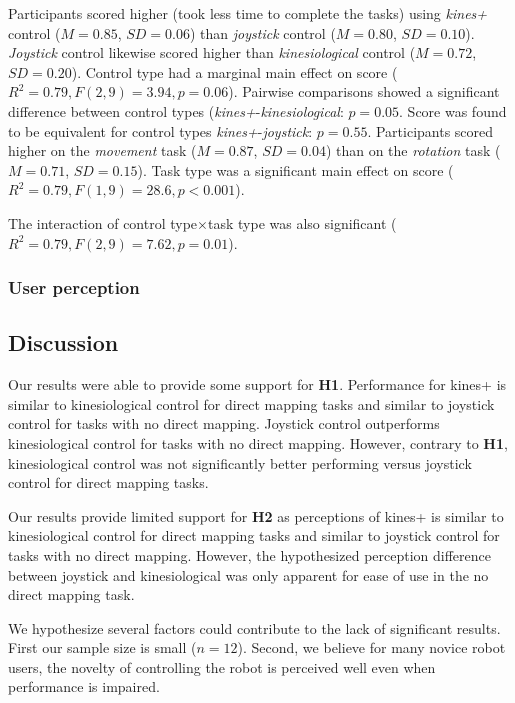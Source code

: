\documentclass{sigchi}
\begin{document}
Participants scored higher (took less time to complete the tasks) using \textit{kines+} control ($M=0.85$, $SD=0.06$) than \textit{joystick} control ($M=0.80$, $SD=0.10$). \textit{Joystick} control likewise scored higher than \textit{kinesiological} control ($M=0.72$, $SD=0.20$). Control type had a marginal main effect on score ($R^{2}=0.79, F(2, 9)=3.94, p=0.06$). Pairwise comparisons showed a significant difference between control types (\textit{kines+}-\textit{kinesiological}: $p=0.05$. Score was found to be equivalent for control types \textit{kines+}-\textit{joystick}: $p=0.55$. Participants scored higher on the \textit{movement} task ($M=0.87$, $SD=0.04$) than on the \textit{rotation} task ($M=0.71$, $SD=0.15$). Task type was a significant main effect on score ($R^{2}=0.79, F(1, 9)=28.6, p<0.001$).

The interaction of control type$\times$task type was also significant  ($R^{2}=0.79, F(2, 9)=7.62, p=0.01$).

\subsubsection{User perception}

\subsection{Discussion}

Our results were able to provide some support for \textbf{H1}. Performance for kines+ is similar to kinesiological control for direct mapping tasks and similar to joystick control for tasks with no direct mapping. Joystick control outperforms kinesiological control for tasks with no direct mapping. However, contrary to \textbf{H1}, kinesiological control was not significantly better performing versus joystick control for direct mapping tasks.

Our results provide limited support for \textbf{H2} as perceptions of kines+ is similar to kinesiological control for direct mapping tasks and similar to joystick control for tasks with no direct mapping. However, the hypothesized perception difference between joystick and kinesiological was only apparent for ease of use in the no direct mapping task.

We hypothesize several factors could contribute to the lack of significant results. First our sample size is small ($n=12$). Second, we believe for many novice robot users, the novelty of controlling the robot is perceived well even when performance is impaired.
\end{document}
